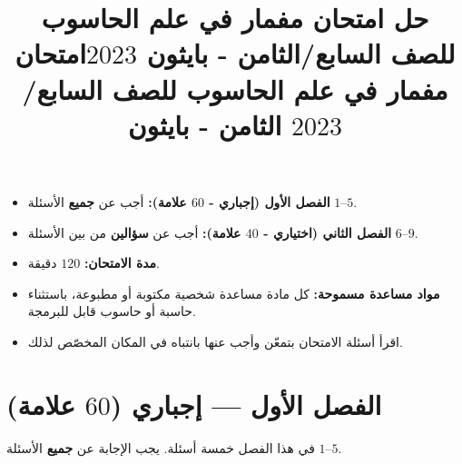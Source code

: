 \documentclass[14pt]{extarticle}
\title{حل امتحان مفمار في علم الحاسوب للصف السابع/الثامن - بايثون $2023$}
\title{امتحان مفمار في علم الحاسوب للصف السابع/الثامن - بايثون $2023$}
\begin{document}
\maketitle
\thispagestyle{fancy}

\ifwithsols
\else
\begin{boxCode}
\begin{itemize}[nosep]
    \item \textbf{الفصل الأول (إجباري - $60$ علامة):} أجب عن \textbf{جميع} الأسئلة $1$–$5$.
    \item \textbf{الفصل الثاني (اختياري - $40$ علامة):} أجب عن \textbf{سؤالين} من بين الأسئلة $6$–$9$.
    \item \textbf{مدة الامتحان:} $120$ دقيقة.
    \item \textbf{مواد مساعدة مسموحة:} كل مادة مساعدة شخصية مكتوبة أو مطبوعة، باستثناء حاسبة أو حاسوب قابل للبرمجة.
    \item اقرأ أسئلة الامتحان بتمعّن وأجب عنها بانتباه في المكان المخصّص لذلك.
\end{itemize}
\end{boxCode}
\fi

\section*{الفصل الأول — إجباري ($60$ علامة)}
في هذا الفصل خمسة أسئلة. يجب الإجابة عن \textbf{جميع} الأسئلة $1$–$5$.
\end{document}
